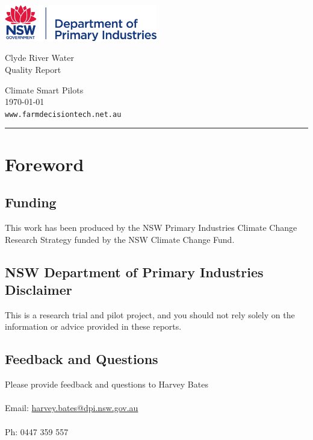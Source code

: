 \documentclass[10pt]{article}
\begin{document}
\begin{titlepage}
		\parbox[t]{0.93\textwidth}{
			\parbox[t]{0.91\textwidth}{
				\raggedright
				\fontsize{50pt}{80pt}\selectfont
				\vspace{0.7cm}
				\includegraphics[width=0.5\textwidth]{DPI_logo.png}
				
				Clyde River Water\\
				Quality Report\\
				\vspace{0.7cm}
			}
		}
	\vfill
	\parbox[t]{0.93\textwidth}{ 
		\raggedleft
		\large
		{\Large Climate Smart Pilots}\\[4pt] 
		\today \\
		\vspace{0.5cm}
		\texttt{www.farmdecisiontech.net.au}\\
		
		\hfill\rule{0.2\linewidth}{1pt}
	}
\end{titlepage}

\section*{Foreword}

\subsection*{Funding}
This work has been produced by the NSW Primary Industries Climate Change Research Strategy funded by the NSW Climate Change Fund.

\subsection*{NSW Department of Primary Industries Disclaimer}
This is a research trial and pilot project, and you should not rely solely on the information or advice provided in these reports.

\subsection*{Feedback and Questions}
Please provide feedback and questions to Harvey Bates \\ \\
Email: \href{mailto:harvey.bates@dpi.nsw.gov.au}{harvey.bates@dpi.nsw.gov.au} \\ \\
Ph: 0447 359 557
\end{document}
